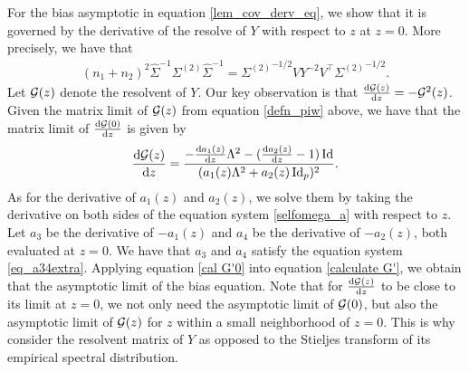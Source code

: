 For the bias asymptotic in equation \eqref{lem_cov_derv_eq}, we show that it is governed by the derivative of the resolve of $Y$ with respect to $z$ at $z = 0$.
More precisely, we have that
\begin{align}\label{calculate G'}
	(n_1 + n_2)^2 \hat{\Sigma}^{-1}\Sigma^{(2)}\hat{\Sigma}^{-1} = {\Sigma^{(2)}}^{-1/2} V Y^{-2} V^{\top} {\Sigma^{(2)}}^{-1/2}.
\end{align}
Let $\cal G(z)$ denote the resolvent of $Y$.
Our key observation is that $\frac{\dd{\cal G(z)}}{\dd z} = - \cal G^2(z)$.
Given the matrix limit of $\cal G(z)$ from equation \eqref{defn_piw} above, we have that the matrix limit of $\frac{\dd{\cal G(0)}}{\dd z}$ is given by
\begin{align}\label{cal G'0}
	\frac{\dd \cal G(z)}{\dd z} = \frac{-\frac{\dd a_1(z)}{\dd z}\Lambda^2 - (\frac{\dd a_2(z)}{\dd z} - 1)\id}{(a_{1}(z)\Lambda^2 + a_{2}(z)\id_p)^2}.
\end{align}
As for the derivative of $a_1(z)$ and $a_2(z)$, we solve them by taking the derivative on both sides of the equation system \eqref{selfomega_a} with respect to $z$.
Let $a_3$ be the derivative of $-a_1(z)$ and $a_4$ be the derivative of $-a_2(z)$, both evaluated at $z = 0$.
We have that $a_3$ and $a_4$ satisfy the equation system \eqref{eq_a34extra}. Applying equation \eqref{cal G'0} into equation \eqref{calculate G'}, we obtain that the asymptotic limit of the bias equation.
Note that for $\frac{\dd \cal G(z)}{\dd z}$ to be close to its limit at $z = 0$, we not only need the asymptotic limit of $\cal G(0)$, but also the asymptotic limit of $\cal G(z)$ for $z$ within a small neighborhood of $z = 0$.
This is why consider the resolvent matrix of $Y$ as opposed to the Stieljes transform of its empirical spectral distribution.

